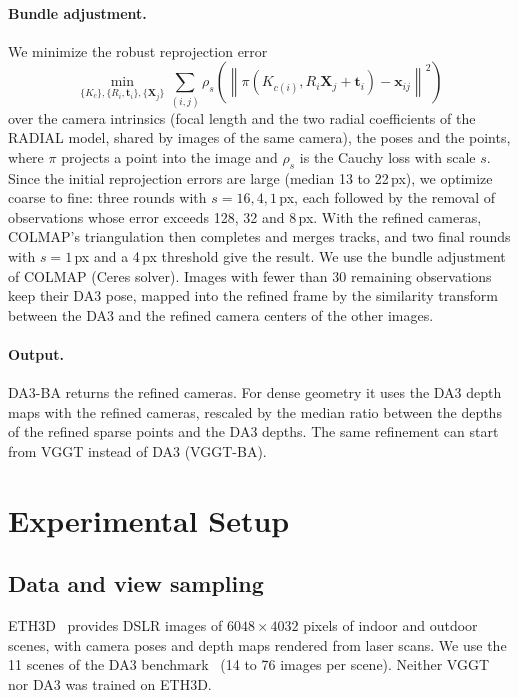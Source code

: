 \documentclass[10pt,twocolumn,letterpaper]{article}
\begin{document}
\paragraph{Bundle adjustment.}
We minimize the robust reprojection error
\begin{equation}
\min_{\{K_c\},\{R_i,\mathbf{t}_i\},\{\mathbf{X}_j\}} \sum_{(i,j)} \rho_s\!\left(
\left\| \pi\!\left(K_{c(i)}, R_i \mathbf{X}_j + \mathbf{t}_i\right) - \mathbf{x}_{ij} \right\|^2 \right)
\end{equation}
over the camera intrinsics (focal length and the two radial coefficients of the RADIAL model, shared
by images of the same camera), the poses and the points, where $\pi$ projects a point into the image and
$\rho_s$ is the Cauchy loss with scale $s$. Since the initial reprojection errors are large (median 13 to 22\,px),
we optimize coarse to fine: three rounds with $s = 16, 4, 1$\,px, each followed by the removal of observations
whose error exceeds 128, 32 and 8\,px. With the refined cameras, COLMAP's triangulation then completes and merges
tracks, and two final rounds with $s=1$\,px and a 4\,px threshold give the result. We use the bundle adjustment
of COLMAP (Ceres solver). Images with fewer than 30 remaining observations keep their DA3 pose, mapped into the
refined frame by the similarity transform between the DA3 and the refined camera centers of the other images.

\paragraph{Output.}
DA3-BA returns the refined cameras. For dense geometry it uses the DA3 depth maps with the refined cameras,
rescaled by the median ratio between the depths of the refined sparse points and the DA3 depths. The same
refinement can start from VGGT instead of DA3 (VGGT-BA).

\section{Experimental Setup}

\subsection{Data and view sampling}

ETH3D~\cite{schops2017eth3d} provides DSLR images of $6048\times4032$ pixels of indoor and outdoor scenes,
with camera poses and depth maps rendered from laser scans. We use the 11 scenes of the DA3
benchmark~\cite{lin2025da3} (14 to 76 images per scene). Neither VGGT nor DA3 was trained on ETH3D.
\end{document}
